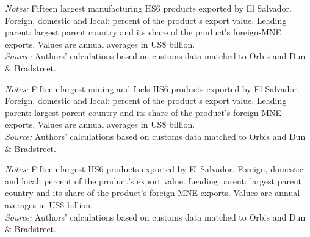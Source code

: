 \documentclass[11pt,a4paper]{article}
\begin{document}
\begin{table}[H]\centering\footnotesize%
  \caption{El Salvador, Manufacturing: Fifteen Largest Export Products}%
  \label{tab:c_hs6_SLV_manufacturing}%
  \par\vspace{3pt}%
  \begin{minipage}{0.95\textwidth}\footnotesize %
  \textit{Notes:} Fifteen largest manufacturing HS6 products exported by El Salvador. Foreign, domestic and local: percent of the product's export value. Leading parent: largest parent country and its share of the product's foreign-MNE exports. Values are annual averages in US\$ billion.\\[3pt]%
  \textit{Source:} Authors' calculations based on customs data matched to Orbis and Dun \& Bradstreet.%
  \end{minipage}%
  \end{table}
\begin{table}[H]\centering\footnotesize%
  \caption{El Salvador, Mining and Fuels: Fifteen Largest Export Products}%
  \label{tab:c_hs6_SLV_mining}%
  \par\vspace{3pt}%
  \begin{minipage}{0.95\textwidth}\footnotesize %
  \textit{Notes:} Fifteen largest mining and fuels HS6 products exported by El Salvador. Foreign, domestic and local: percent of the product's export value. Leading parent: largest parent country and its share of the product's foreign-MNE exports. Values are annual averages in US\$ billion.\\[3pt]%
  \textit{Source:} Authors' calculations based on customs data matched to Orbis and Dun \& Bradstreet.%
  \end{minipage}%
  \end{table}
\begin{table}[H]\centering\footnotesize%
  \caption{El Salvador, Other Goods: Fifteen Largest Export Products}%
  \label{tab:c_hs6_SLV_rest}%
  \par\vspace{3pt}%
  \begin{minipage}{0.95\textwidth}\footnotesize %
  \textit{Notes:} Fifteen largest HS6 products exported by El Salvador. Foreign, domestic and local: percent of the product's export value. Leading parent: largest parent country and its share of the product's foreign-MNE exports. Values are annual averages in US\$ billion.\\[3pt]%
  \textit{Source:} Authors' calculations based on customs data matched to Orbis and Dun \& Bradstreet.%
  \end{minipage}%
  \end{table}
\end{document}
